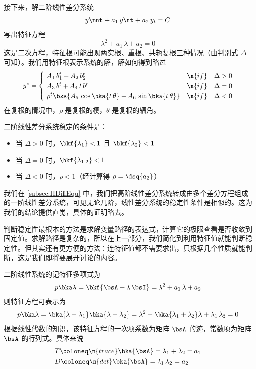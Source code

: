 
接下来，解二阶线性差分系统
\begin{equation*}
    y\nnt + a_1\,y\nt + a_2\,y_t = C
\end{equation*}
写出特征方程
\begin{equation*}
    \lambda^2 + a_1\,\lambda + a_2 = 0
\end{equation*}
这是二次方程，特征根可能出现两实根、重根、共轭复根三种情况（由判别式 \(\Delta\) 可知）。我们用特征根表示系统的解，解如何得到略过
\begin{equation*}
    y^c=\begin{cases}
        \ A_1\,b^t_1+A_2\,b^t_2 & \n{ if}\quad \Delta>0\\
        \ A_3\,b^t + A_4\,t\,b^t & \n{ if}\quad \Delta=0\\
        \ \rho^t\bks{A_5\,\cos\bka{t\,\theta} + A_6\,\sin\bka{t\,\theta}} & \n{ if}\quad \Delta<0
    \end{cases}
\end{equation*}
在复根的情况中，\(\rho\) 是复根的模，\(\theta\) 是复根的辐角。

二阶线性差分系统稳定的条件是：
\begin{itemize}
    \item 当 \(\Delta>0\) 时，\(\bkf{\lambda_1}<1\) 且 \(\bkf{\lambda_2}<1\)
    \item 当 \(\Delta=0\) 时，\(\bkf{\lambda_{1,2}}<1\)
    \item 当 \(\Delta<0\) 时，\(\rho<1\)（经计算得 \(\rho=\dsq{a_2}\)）
\end{itemize}
我们在 \ref{subsec:HDiffEqu} 中，我们把高阶线性差分系统转成由多个差分方程组成的一阶线性差分系统，可见无论几阶，线性差分系统的稳定性条件是相似的。这为我们的结论提供直觉，具体的证明略去。


判断稳定性最根本的方法是求解变量路径的表达式，计算它的极限查看是否收敛到固定值。求解路径是复杂的，所以在上一部分，我们简化到利用特征值就能判断稳定性。但其实还有更方便的方法：连特征值都不需要求出，只根据几个性质就能判断，这是我们即将要展开讨论的内容。

二阶线性系统的记特征多项式为
\begin{equation*}
    p\bka\lambda=\bkf{\bsA-\lambda\,\bsI}=\lambda^2 + a_1\,\lambda + a_2
\end{equation*}
则特征方程可表示为
\begin{align*}
    p\bka\lambda=\bka{\lambda-\lambda_1}\bka{\lambda-\lambda_2}= \lambda^2 - \bka{\lambda_1+\lambda_2}\lambda + \lambda_1\,\lambda_2=0
\end{align*}
根据线性代数的知识，该特征方程的一次项系数为矩阵 \(\bsA\) 的迹，常数项为矩阵 \(\bsA\) 的行列式。具体来说
\begin{align*}
    &T\coloneq \n{trace}\bka{\bsA}=\lambda_1+\lambda_2=a_1\\
    &D\coloneq \n{det}\bka{\bsA}=\lambda_1\,\lambda_2=a_2
\end{align*}

